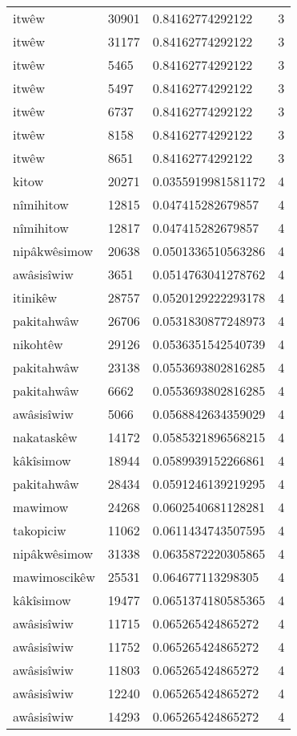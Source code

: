 \begin{longtable}{llll}
itwêw & 30901 & 0.84162774292122 & 3 \\
itwêw & 31177 & 0.84162774292122 & 3 \\
itwêw & 5465 & 0.84162774292122 & 3 \\
itwêw & 5497 & 0.84162774292122 & 3 \\
itwêw & 6737 & 0.84162774292122 & 3 \\
itwêw & 8158 & 0.84162774292122 & 3 \\
itwêw & 8651 & 0.84162774292122 & 3 \\
kitow & 20271 & 0.0355919981581172 & 4 \\
nîmihitow & 12815 & 0.047415282679857 & 4 \\
nîmihitow & 12817 & 0.047415282679857 & 4 \\
nipâkwêsimow & 20638 & 0.0501336510563286 & 4 \\
awâsisîwiw & 3651 & 0.0514763041278762 & 4 \\
itinikêw & 28757 & 0.0520129222293178 & 4 \\
pakitahwâw & 26706 & 0.0531830877248973 & 4 \\
nikohtêw & 29126 & 0.0536351542540739 & 4 \\
pakitahwâw & 23138 & 0.0553693802816285 & 4 \\
pakitahwâw & 6662 & 0.0553693802816285 & 4 \\
awâsisîwiw & 5066 & 0.0568842634359029 & 4 \\
nakataskêw & 14172 & 0.0585321896568215 & 4 \\
kâkîsimow & 18944 & 0.0589939152266861 & 4 \\
pakitahwâw & 28434 & 0.0591246139219295 & 4 \\
mawimow & 24268 & 0.0602540681128281 & 4 \\
takopiciw & 11062 & 0.0611434743507595 & 4 \\
nipâkwêsimow & 31338 & 0.0635872220305865 & 4 \\
mawimoscikêw & 25531 & 0.064677113298305 & 4 \\
kâkîsimow & 19477 & 0.0651374180585365 & 4 \\
awâsisîwiw & 11715 & 0.065265424865272 & 4 \\
awâsisîwiw & 11752 & 0.065265424865272 & 4 \\
awâsisîwiw & 11803 & 0.065265424865272 & 4 \\
awâsisîwiw & 12240 & 0.065265424865272 & 4 \\
awâsisîwiw & 14293 & 0.065265424865272 & 4 \\

\end{longtable}
